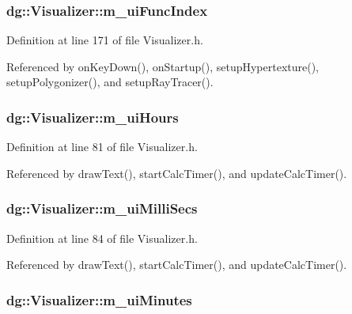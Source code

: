 \subsubsection{ dg::Visualizer::m\_\-ui\-Func\-Index\hspace{0.3cm}{\tt  [protected]}}\label{classdg_1_1Visualizer_n51}




Definition at line 171 of file Visualizer.h.

Referenced by on\-Key\-Down(), on\-Startup(), setup\-Hypertexture(), setup\-Polygonizer(), and setup\-Ray\-Tracer().
\subsubsection{ dg::Visualizer::m\_\-ui\-Hours\hspace{0.3cm}{\tt  [protected]}}\label{classdg_1_1Visualizer_n1}




Definition at line 81 of file Visualizer.h.

Referenced by draw\-Text(), start\-Calc\-Timer(), and update\-Calc\-Timer().
\subsubsection{ dg::Visualizer::m\_\-ui\-Milli\-Secs\hspace{0.3cm}{\tt  [protected]}}\label{classdg_1_1Visualizer_n4}




Definition at line 84 of file Visualizer.h.

Referenced by draw\-Text(), start\-Calc\-Timer(), and update\-Calc\-Timer().
\subsubsection{ dg::Visualizer::m\_\-ui\-Minutes\hspace{0.3cm}{\tt  [protected]}}\label{classdg_1_1Visualizer_n2}




